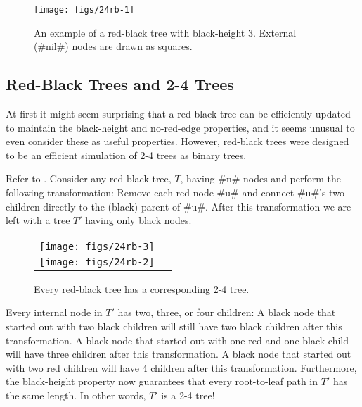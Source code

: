 \begin{figure}
  \begin{center}
    \texttt{[image: figs/24rb-1]}
  \end{center}
  \caption[A red-black tree]{An example of a red-black tree with black-height 3.  External (#nil#) nodes are drawn as squares.} 
\end{figure}


\subsection{Red-Black Trees and 2-4 Trees}

At first it might seem surprising that a red-black tree can be efficiently
updated to maintain the black-height and no-red-edge properties, and
it seems unusual to even consider these as useful properties.  However,
red-black trees were designed to be an efficient simulation of 2-4 trees
as binary trees.

Refer to .
Consider any red-black tree, $T$, having #n# nodes and perform the
following transformation: Remove each red node #u# and connect #u#'s two
children directly to the (black) parent of #u#.  After this transformation
we are left with a tree $T'$ having only black nodes.
\begin{figure}
  \begin{center}
    \begin{tabular}{cc}
      \texttt{[image: figs/24rb-3]} \\
      \texttt{[image: figs/24rb-2]}
    \end{tabular}
  \end{center}
  \caption{Every red-black tree has a corresponding 2-4 tree.}
\end{figure}

Every internal node in $T'$ has two, three, or four children: A black
node that started out with two black children will still have two
black children after this transformation.  A black node that started
out with one red and one black child will have three children after this
transformation.  A black node that started out with two red children will
have 4 children after this transformation.  Furthermore, the black-height
property now guarantees that every root-to-leaf path in $T'$ has the
same length.  In other words, $T'$ is a 2-4 tree!

